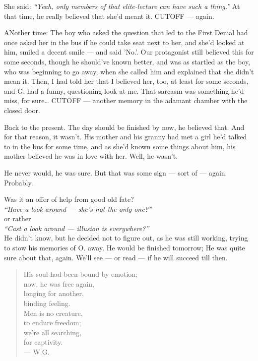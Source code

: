 She said: \emph{\enquote{Yeah, only members of that elite-lecture can have such a thing.}}
At that time, he really believed that she'd meant it. 
CUTOFF --- again.

ANother time: The boy who asked the question that led to the First Denial had once asked her in the bus if he could take seat next to her, and she'd looked at him, smiled a decent smile --- and said 'No.'.
Our protagonist still believed this for some seconds, though he should've known better, and was as startled as the boy, who was beginning to go away, when she called him and explained that she didn't mean it. Then, I had told her that I believed her, too, at least for some seconds, and G. had a funny, questioning look at me. 
That sarcasm was something he'd miss, for sure\ldots
CUTOFF --- another memory in the adamant chamber with the closed door.

Back to the present. 
The day should be finished by now, he believed that. 
And for that reason, it wasn't. 
His mother and his granny had met a girl he'd talked to in the bus for some time, and as she'd known some things about him, his mother believed he was in love with her. 
Well, he wasn't. 

He never would, he was sure. 
But that was some sign --- sort of --- again. 
Probably.

Was it an offer of help from good old fate?\\
\emph{\enquote{Have a look around --- she's not the only one?}}\\
    or rather\\
\emph{\enquote{Cast a look around --- illusion is everywhere?}}\\
He didn't know, but he decided not to figure out, as he was still working, trying to stow his memories of O. away. 
He would be finished tomorrow; He was quite sure about that, again. 
We'll see --- or read --- if he will succeed till then. 

\begin{verse}
His soul had been bound by emotion;\\
now, he was free again,\\
longing for another,\\
binding feeling. \\
Men is no creature,\\
to endure freedom;\\
we're all searching,\\
for captivity. \\
--- W.G.
\end{verse}

